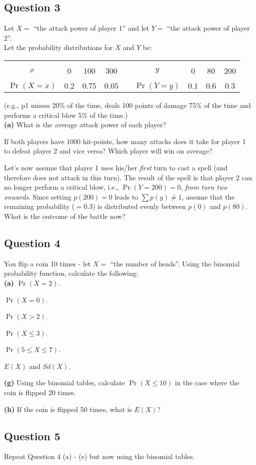 
\subsection*{Question 3}
Let $X =$ ``the attack power of player 1'' and let $Y =$ ``the attack power of player 2''.\\[-0.3cm]

Let the probability distributions for $X$ and $Y$ be:
\begin{center}
	\begin{tabular}{|c|ccc|c|c|ccc|}
		\cline{1-4}\cline{6-9}
		&&&&&&&&\\[-0.4cm]
		$x$ & 0 & 100 & 300 & \qquad\qquad & $y$ & 0 & 80 & 200\\
		\cline{1-4}\cline{6-9}
		&&&&&&&&\\[-0.4cm]
		$\Pr(X=x)$ & $0.2$ & $0.75$ & $0.05$ & & $\Pr(Y=y)$ & $0.1$ & $0.6$ & $0.3$ \\[0.1cm]
		\cline{1-4}\cline{6-9}
	\end{tabular}
\end{center}
{\footnotesize(e.g., p1 misses 20\% of the time, deals 100 points of damage 75\% of the time and performs a critical blow 5\% of the time.)}\\[-0.2cm]

{\bf(a)} What is the average attack power of each player? 
 \item  If both players have 1000 hit-points, how many attacks does it take for player 1 to defeat player 2 and vice versa? Which player will win on average? 
 \item  Let's now assume that player 1 uses his/her \emph{first} turn to cast a spell (and therefore does not attack in this turn). The result of the spell is that player 2 can no longer perform a critical blow, i.e., $\Pr(Y=200) = 0$, \emph{from turn two onwards}. Since setting $p(200) = 0$ leads to $\sum p(y) \ne 1$, assume that the remaining probability ($= 0.3$) is distributed evenly between $p(0)$ and $p(80)$. What is the outcome of the battle now?


\subsection*{Question 4}

You flip a coin 10 times - let $X =$ ``the number of heads''. Using the binomial probability function, calculate the following:\\[-0.2cm]

{\bf(a)} $\Pr(X = 2)$. 
 \item  $\Pr(X = 0)$. 
 \item   $\Pr(X > 2)$. 
 \item  $\Pr(X \le 3)$. 
 \item  $\Pr(5 \le X \le 7)$.  
 \item  $E(X)$ and $Sd(X)$. 
 \item {\bf(g)} Using the binomial tables, calculate $\Pr(X \le10)$ in the case where the coin is flipped 20 times. 
 \item {\bf(h)} If the coin is flipped 50 times, what is $E(X)$?

\subsection*{Question 5}

Repeat Question 4 (a) - (e) but now using the binomial tables.

